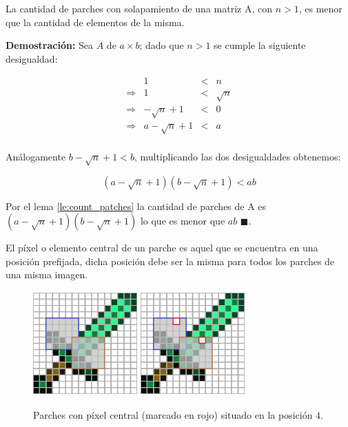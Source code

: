 \begin{lemma}\label{le:count_patches_ieq}
	La cantidad de parches con solapamiento de una matriz A, con $n > 1$, es menor que la cantidad de elementos de la misma.
\end{lemma}

\textbf{Demostraci\'on:} Sea $A$ de $a \times b$; dado que $n > 1$ se cumple la siguiente desigualdad:

\begin{equation}
	\begin{array}{lrcl}
		                &               1 &<& n        \\ 
		\Longrightarrow &               1 &<& \sqrt{n} \\
		\Longrightarrow &   -\sqrt{n} + 1 &<& 0        \\
		\Longrightarrow & a -\sqrt{n} + 1 &<& a        \\
	\end{array}
\end{equation}

An\'alogamente $b -\sqrt{n} + 1 < b$, multiplicando las dos desigualdades obtenemos:

\begin{equation}
	(a - \sqrt{n} + 1)(b - \sqrt{n} + 1) < ab
	\label{eq:count_patches_ieq}
\end{equation}

Por el lema \ref{le:count_patches} la cantidad de parches de A es $(a - \sqrt{n} + 1)(b - \sqrt{n} + 1)$ lo que es menor que $ab$ $\blacksquare$.

\begin{definition}
	El p\'ixel o elemento central de un parche es aquel que se encuentra en una posici\'on prefijada, dicha posici\'on debe ser la misma para todos los parches de una misma imagen.
\end{definition}

\begin{figure}[h]
	\centering
	\includegraphics[width=4cm, height=4cm]{Graphics/diamon_sword_with_patches.png}
	\hspace{1cm}
	\includegraphics[width=4cm, height=4cm]{Graphics/diamon_sword_with_patches_and_centers.png}
	\caption{Parches con p\'ixel central (marcado en rojo) situado en la posici\'on $4$.}
	\label{ex:patch_center}
\end{figure}

